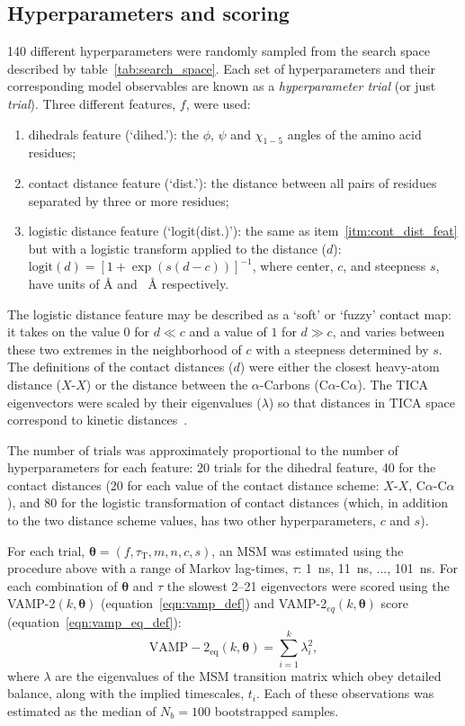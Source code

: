 \documentclass[journal=jacsat,manuscript=article]{achemso}
\begin{document}
\subsection{Hyperparameters and scoring}
\num{140} different hyperparameters were randomly sampled from the search space described by table~\ref{tab:search_space}. Each set of hyperparameters and their corresponding model observables are known as a \emph{hyperparameter trial} (or just \emph{trial}). Three different features, $f$, were used: 
\begin{enumerate}
    \item dihedrals feature (`dihed.'): the $\phi$, $\psi$ and $\chi_{1-5}$ angles of the amino acid residues;
    \item contact distance feature (`dist.'): the distance between all pairs of residues separated by three or more residues; \label{itm:cont_dist_feat}
    \item logistic distance feature (`logit(dist.)'): the same as item~\ref{itm:cont_dist_feat} but with a logistic transform applied to the distance ($d$): $\mathrm{logit}(d) = [1+\exp{(s(d-c))}]^{-1}$, where center, $c$, and steepness $s$,  have units of \si{\angstrom} and \si{\per\angstrom} respectively.
\end{enumerate}
The logistic distance feature may be described as a `soft' or `fuzzy' contact map: it takes on the value $0$ for $d \ll c$ and a value of $1$ for $d\gg c$, and varies between these two extremes in the neighborhood of $c$ with a steepness determined by $s$. The definitions of the contact distances ($d$) were either the closest heavy-atom distance ($X$-$X$) or the distance between the $\alpha$-Carbons (C$\alpha$-C$\alpha$). The TICA eigenvectors were scaled by their eigenvalues ($\lambda$) so that distances in TICA space correspond to kinetic distances~\cite{noeKineticDistanceKinetic2015}.

The number of trials was approximately proportional to the number of hyperparameters for each feature: 20 trials for the dihedral feature, 40 for the contact distances (20 for each value of the contact distance scheme: $X$-$X$,  C$\alpha$-C$\alpha$), and 80 for the logistic transformation of contact distances (which, in addition to the two distance scheme values, has two other hyperparameters, $c$ and $s$). 

For each trial,  $\bm{\theta} = (f, \tau_{\mathrm{T}}, m, n, c, s)$,  an MSM was estimated using the procedure above with a range of Markov lag-times, $\tau$: \SI{1}{\nano\second}, \SI{11}{\nano\second}, ..., \SI{101}{\nano\second}. For each combination of $\bm{\theta}$ and  $\tau$ the slowest \numrange{2}{21} eigenvectors were scored using the VAMP-2$(k, \bm{\theta})$ (equation~\ref{eqn:vamp_def}) and  VAMP-2$_{eq}(k, \bm{\theta})$ score (equation~\ref{eqn:vamp_eq_def}):
\begin{equation}
    \operatorname{VAMP-2_{eq}}(k, \bm{\theta}) = \sum_{i=1}^{k}\lambda_{i}^{2}, \label{eqn:vamp_eq_def}
\end{equation}
where $\lambda$ are the eigenvalues of the MSM transition matrix which obey detailed balance, along with the implied timescales, $t_i$.  Each of these observations was estimated as the median of $N_b=100$ bootstrapped samples. 
\end{document}
